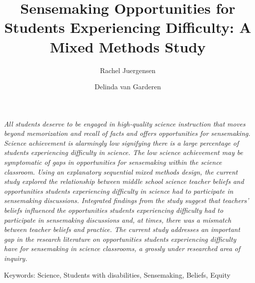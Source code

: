 \documentclass{sig-alternate} %
\makeatletter
\let\oldabstract\abstract
\let\oldendabstract\endabstract
\renewenvironment{abstract} %
{\renewenvironment{quotation}%
               {\list{}{\addtolength{\leftmargin}{1em} %
                        \listparindent 1.5em%
                        \itemindent    \listparindent%
                        \rightmargin   \leftmargin%
                        \parsep        \z@ \@plus\p@}%
                \item\relax}%
               {\endlist}%
\oldabstract}
{\oldendabstract}
\makeatother
\begin{document}
\title{Sensemaking Opportunities for Students Experiencing Difficulty: A Mixed Methods Study}

\author[1]{\large \color{blue} Rachel Juergensen} %
\author[2]{\large \color{blue} Delinda van Garderen} %


\toappear{} %

\maketitle %
\begin{@twocolumnfalse} 
\begin{abstract}
\item %
\begin{large}
\textit{All students deserve to be engaged in high-quality science instruction that moves beyond memorization and recall of facts and offers opportunities for sensemaking. Science achievement is alarmingly low signifying there is a large percentage of students experiencing difficulty in science. The low science achievement may be symptomatic of gaps in opportunities for sensemaking within the science classroom. Using an explanatory sequential mixed methods design, the current study explored the relationship between middle school science teacher beliefs and opportunities students experiencing difficulty in science had to participate in sensemaking discussions. Integrated findings from the study suggest that teachers’ beliefs influenced the opportunities students experiencing difficulty had to participate in sensemaking discussions and, at times, there was a mismatch between teacher beliefs and practice. The current study addresses an important gap in the research literature on opportunities students experiencing difficulty have for sensemaking in science classrooms, a grossly under researched area of inquiry.}
\item Keywords: Science, Students with disabilities, Sensemaking, Beliefs, Equity

\end{large}     
\end{abstract}
\end{@twocolumnfalse}
\end{document}
